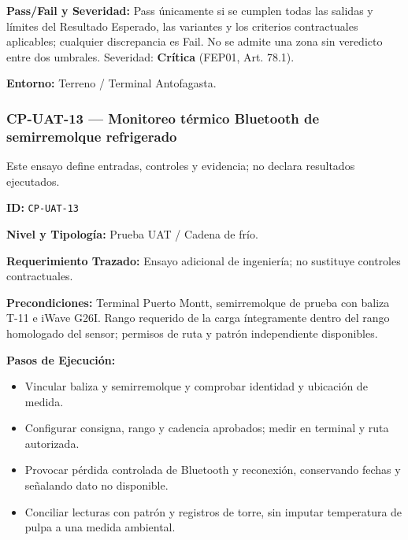 \par\noindent\textbf{Pass/Fail y Severidad:} Pass únicamente si se cumplen todas las salidas y límites del Resultado Esperado, las variantes y los criterios contractuales aplicables; cualquier discrepancia es Fail. No se admite una zona sin veredicto entre dos umbrales. Severidad: \textbf{Crítica} (FEP01, Art. 78.1).\par
\par\noindent\textbf{Entorno:} Terreno / Terminal Antofagasta.\par






\subsubsection*{CP-UAT-13 — Monitoreo térmico Bluetooth de semirremolque refrigerado}\label{sec:9-cp-uat-13}

Este ensayo define entradas, controles y evidencia; no declara resultados ejecutados.

\par\noindent\textbf{ID:} \texttt{CP-\allowbreak{}UAT-\allowbreak{}13}\par
\par\noindent\textbf{Nivel y Tipología:} Prueba UAT / Cadena de frío.\par
\par\noindent\textbf{Requerimiento Trazado:} Ensayo adicional de ingeniería; no sustituye controles contractuales.\par
\par\noindent\textbf{Precondiciones:} Terminal Puerto Montt, semirremolque de prueba con baliza T-11 e iWave G26I. Rango requerido de la carga íntegramente dentro del rango homologado del sensor; permisos de ruta y patrón independiente disponibles.\par
\par\noindent\textbf{Pasos de Ejecución:}\par
\begin{itemize}
\item Vincular baliza y semirremolque y comprobar identidad y ubicación de medida.
\item Configurar consigna, rango y cadencia aprobados; medir en terminal y ruta autorizada.
\item Provocar pérdida controlada de Bluetooth y reconexión, conservando fechas y señalando dato no disponible.
\item Conciliar lecturas con patrón y registros de torre, sin imputar temperatura de pulpa a una medida ambiental.
\end{itemize}

